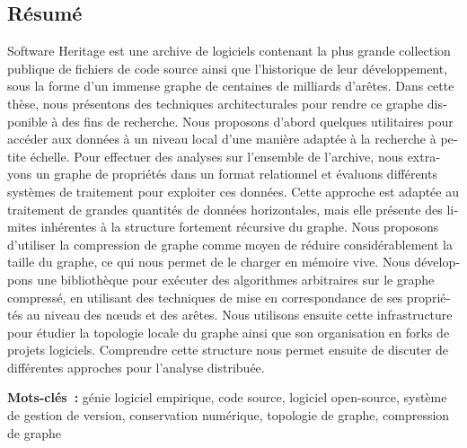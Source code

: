 \begin{minipage}[b][0.49\textheight][t]{0.96\textwidth}
\vspace{6mm}

\begin{otherlanguage}{french}
\section*{Résumé}
\begin{SingleSpace}

Software Heritage est une archive de logiciels contenant la plus
grande collection publique de fichiers de code source ainsi que l'historique de
leur développement, sous la forme d'un immense graphe de centaines de milliards
d'arêtes. Dans cette thèse, nous présentons des techniques architecturales pour
rendre ce graphe disponible à des fins de recherche. Nous proposons d'abord
quelques utilitaires pour accéder aux données à un niveau local d'une manière
adaptée à la recherche à petite échelle. Pour effectuer des analyses sur
l'ensemble de l'archive, nous extrayons un graphe de propriétés dans un format
relationnel et évaluons différents systèmes de traitement pour exploiter ces
données. Cette approche est adaptée au traitement de grandes quantités de
données horizontales, mais elle présente des limites inhérentes à la structure
fortement récursive du graphe. Nous proposons d'utiliser la compression de
graphe comme moyen de réduire considérablement la taille du graphe, ce qui nous
permet de le charger en mémoire vive. Nous développons une bibliothèque pour
exécuter des algorithmes arbitraires sur le graphe compressé, en utilisant
des techniques de mise en correspondance de ses propriétés au
niveau des nœuds et des arêtes. Nous utilisons ensuite cette infrastructure
pour étudier la topologie locale du graphe ainsi que son organisation en forks
de projets logiciels. Comprendre cette structure nous permet ensuite de
discuter de différentes approches pour l'analyse distribuée.

\vspace{3mm}

\textbf{Mots-clés~:} génie logiciel empirique, code source, logiciel
open-source, système de gestion de version, conservation numérique, topologie
de graphe, compression de graphe

\end{SingleSpace}
\end{otherlanguage}
\end{minipage}

